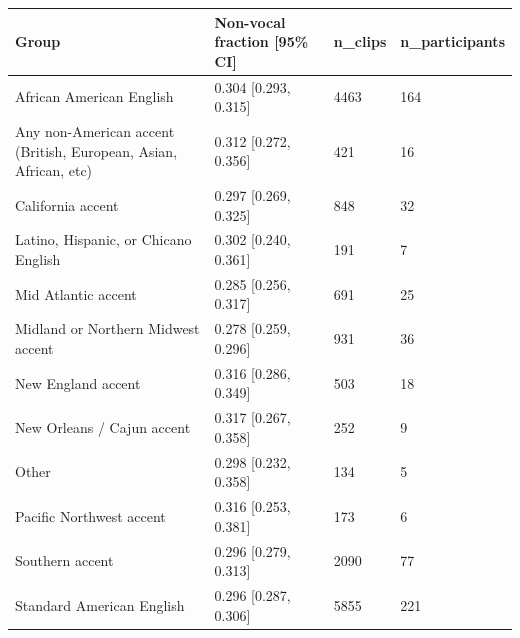 \begin{tabular}{llll}
\toprule
Group & Non-vocal fraction [95\% CI] & n\_clips & n\_participants \\
\midrule
African American English & 0.304 [0.293, 0.315] & 4463 & 164 \\
Any non-American accent (British, European, Asian, African, etc) & 0.312 [0.272, 0.356] & 421 & 16 \\
California accent & 0.297 [0.269, 0.325] & 848 & 32 \\
Latino, Hispanic, or Chicano English & 0.302 [0.240, 0.361] & 191 & 7 \\
Mid Atlantic accent & 0.285 [0.256, 0.317] & 691 & 25 \\
Midland or Northern Midwest accent & 0.278 [0.259, 0.296] & 931 & 36 \\
New England accent & 0.316 [0.286, 0.349] & 503 & 18 \\
New Orleans / Cajun accent & 0.317 [0.267, 0.358] & 252 & 9 \\
Other & 0.298 [0.232, 0.358] & 134 & 5 \\
Pacific Northwest accent & 0.316 [0.253, 0.381] & 173 & 6 \\
Southern accent & 0.296 [0.279, 0.313] & 2090 & 77 \\
Standard American English & 0.296 [0.287, 0.306] & 5855 & 221 \\
\bottomrule
\end{tabular}
